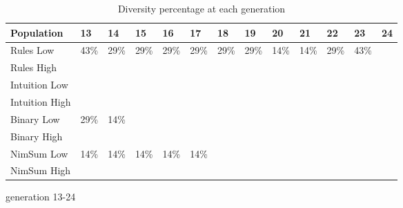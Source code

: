 \begin{table}
	\medskip
	\begin{subtable}{\linewidth}
	\centering
		\begin{tabular}{lllllllllllll}\hline
		Population & 13 & 14 & 15 & 16 & 17 & 18 & 19 & 20 & 21 & 22 & 23 & 24\\\hline
		Rules Low & 43\% & 29\% & 29\% & 29\% & 29\% & 29\% & 29\% & 14\% & 14\% & 29\% & 43\% & \textemdash \\
		Rules High & \textemdash & \textemdash & \textemdash & \textemdash & \textemdash & \textemdash & \textemdash & \textemdash & \textemdash & \textemdash & \textemdash & \textemdash \\
		Intuition Low & \textemdash & \textemdash & \textemdash & \textemdash & \textemdash & \textemdash & \textemdash & \textemdash & \textemdash & \textemdash & \textemdash & \textemdash \\
		Intuition High & \textemdash & \textemdash & \textemdash & \textemdash & \textemdash & \textemdash & \textemdash & \textemdash & \textemdash & \textemdash & \textemdash & \textemdash \\
		Binary Low & 29\% & 14\% & \textemdash & \textemdash & \textemdash & \textemdash & \textemdash & \textemdash & \textemdash & \textemdash & \textemdash & \textemdash \\
		Binary High & \textemdash & \textemdash & \textemdash & \textemdash & \textemdash & \textemdash & \textemdash & \textemdash & \textemdash & \textemdash & \textemdash & \textemdash \\
		NimSum Low & 14\% & 14\% & 14\% & 14\% & 14\% & \textemdash & \textemdash & \textemdash & \textemdash & \textemdash & \textemdash & \textemdash \\
		NimSum High & \textemdash & \textemdash & \textemdash & \textemdash & \textemdash & \textemdash & \textemdash & \textemdash & \textemdash & \textemdash & \textemdash & \textemdash \\
		\end{tabular}
	\caption{generation 13-24}
	\end{subtable}
	\caption{Diversity percentage at each generation}
	\label{tab:results_diversity}
\end{table}

